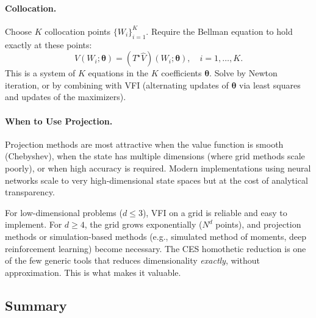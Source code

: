 \paragraph{Collocation.}
Choose $K$ collocation points $\{W_i\}_{i=1}^{K}$. Require the Bellman equation to hold exactly at these points:
\begin{equation}
\hat V(W_i; \boldsymbol\theta) = (T^\star \hat V)(W_i; \boldsymbol\theta), \quad i = 1, \ldots, K.
\label{eq:collocation}
\end{equation}
This is a system of $K$ equations in the $K$ coefficients $\boldsymbol\theta$. Solve by Newton iteration, or by combining with VFI (alternating updates of $\boldsymbol\theta$ via least squares and updates of the maximizers).

\paragraph{When to Use Projection.}
Projection methods are most attractive when the value function is smooth (Chebyshev), when the state has multiple dimensions (where grid methods scale poorly), or when high accuracy is required. Modern implementations using neural networks scale to very high-dimensional state spaces but at the cost of analytical transparency.

\begin{calloutnote}
For low-dimensional problems ($d \leq 3$), VFI on a grid is reliable and easy to implement. For $d \geq 4$, the grid grows exponentially ($N^d$ points), and projection methods or simulation-based methods (e.g., simulated method of moments, deep reinforcement learning) become necessary. The CES homothetic reduction is one of the few generic tools that reduces dimensionality \emph{exactly}, without approximation. This is what makes it valuable.
\end{calloutnote}

\subsection{Summary}
\label{subsec:dp-solution-summary}

